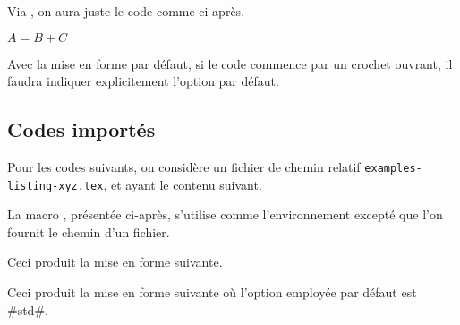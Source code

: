 

\begin{tdocexa}
    Via , on aura juste le code comme ci-après.

    \begin{tdoclatex}[code]
        $A = B + C$
    \end{tdoclatex}
\end{tdocexa}




\begin{tdocwarn}
    Avec la mise en forme par défaut, si le code commence par un crochet ouvrant, il faudra indiquer explicitement l'option par défaut.
\end{tdocwarn}


\subsection{Codes importés}

Pour les codes suivants, on considère un fichier de chemin relatif \verb+examples-listing-xyz.tex+, et ayant le contenu suivant.


\medskip

La macro  , présentée ci-après, s'utilise comme l'environnement  excepté que l'on fournit le chemin d'un fichier.




\begin{tdocexa}
    \leavevmode

    \begin{tdoclatex}[code]
    \end{tdoclatex}

    Ceci produit la mise en forme suivante.

\end{tdocexa}




\begin{tdocexa}[À la suite]
    \leavevmode

    \begin{tdoclatex}[code]
    \end{tdoclatex}

    Ceci produit la mise en forme suivante où l'option employée par défaut est \tdocinlatex#std#.

\end{tdocexa}


